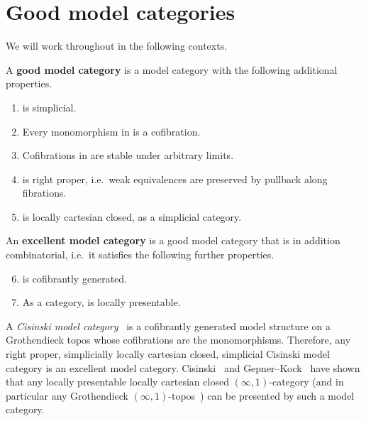 \section{Good model categories}
\label{sec:model-categ-type}

We will work throughout in the following contexts.

\begin{defn}
  A \textbf{good model category} is a model category \sM with the following additional properties.
  \begin{enumerate}
  \item \sM is simplicial.\label{item:m0}
  \item Every monomorphism in \sM is a cofibration.\label{item:m1}
  \item Cofibrations in \sM are stable under arbitrary limits.\label{item:m1a}
  \item \sM is right proper, i.e.\ weak equivalences are preserved by pullback along fibrations.\label{item:m2}
  \item \sM is locally cartesian closed, as a simplicial category.\label{item:m3}
  \end{enumerate}
  An \textbf{excellent model category} is a good model category that is in addition combinatorial, i.e.\ it satisfies the following further properties.
  \begin{enumerate}\setcounter{enumi}{5}
  \item \sM is cofibrantly generated.
  \item As a category, \sM is locally presentable.
  \end{enumerate}
\end{defn}

\begin{eg}
A \emph{Cisinski model category}~\cite{cisinski:topos,cisinski:presheaves} is a cofibrantly generated model structure on a Grothendieck topos whose cofibrations are the monomorphisms.
Therefore, any right proper, simplicially locally cartesian closed, simplicial Cisinski model category is an excellent model category.
Cisinski~\cite{cisinski:lccc-rpcmc} and Gepner--Kock~\cite{gk:univlcc} have shown that any locally presentable locally cartesian closed $(\infty,1)$-category (and in particular any Grothendieck $(\infty,1)$-topos~\cite{lurie:higher-topoi}) can be presented by such a model category.
\end{eg}

